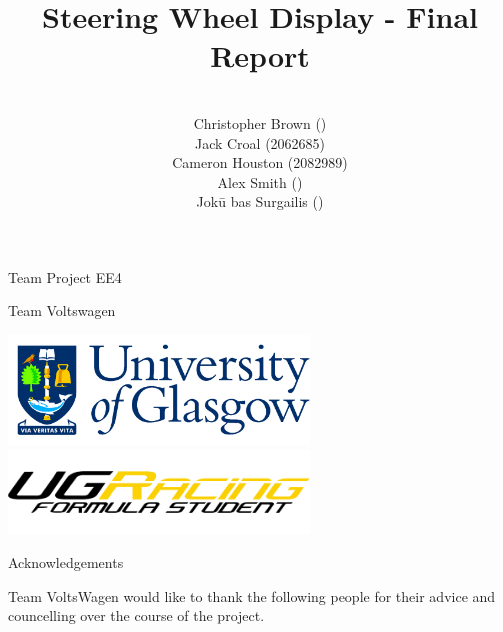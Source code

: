 \documentclass[a4paper,12pt]{article}
\author{\vspace{1cm} \\
        Christopher Brown () \\
        Jack Croal (2062685) \\
        Cameron Houston (2082989) \\
        Alex Smith () \\
        Jok\=u bas Surgailis () \\
}
\date{}
\title{\vspace{1.0cm}Steering Wheel Display - Final Report\vspace{1.0cm}}
\begin{document}
\maketitle

\thispagestyle{empty}

\begin{center}
\Large{Team Project EE4}
\end{center}

\begin{center}
\huge{Team Voltswagen}
\end{center}

\vspace{2.0cm}

\begin{center}
\includegraphics[width=8cm]{Figures/uni_logo.png}
\includegraphics[width=8cm]{Figures/ugr_logo_black.png}
\end{center}

\newpage
\clearpage
{}


\newpage
{\Huge Acknowledgements} \\

{\large

  \vspace{1.0cm}

  Team VoltsWagen would like to thank the following people for their advice and councelling over the course of the project. \\

  \vspace{1.0cm}


}

\end{document}
